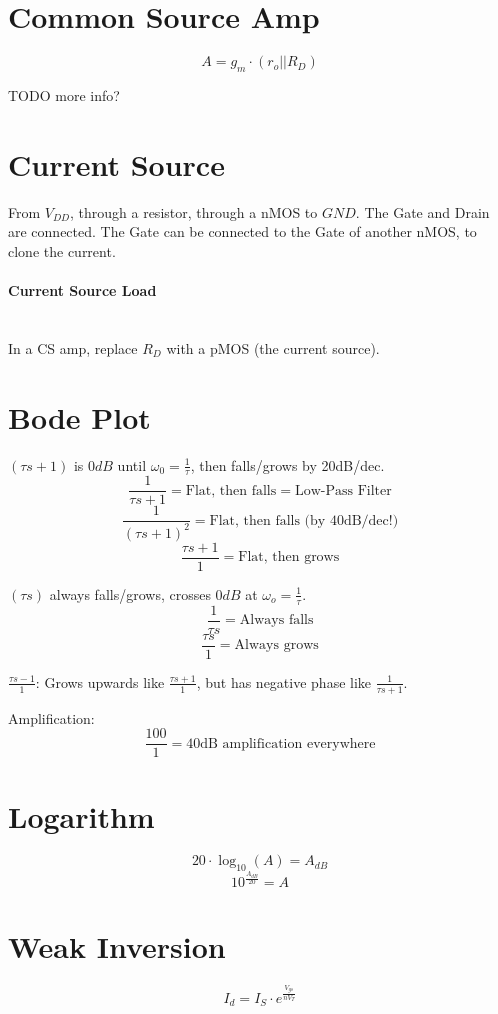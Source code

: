 \documentclass[twocolumn]{article}
\begin{document}
  \section{Common Source Amp}
    $$A = g_m \cdot (r_o || R_D)$$

    TODO more info?

  \section{Current Source}
    From $V_{DD}$, through a resistor, through a nMOS to $GND$.
    The Gate and Drain are connected.
    The Gate can be connected to the Gate of another nMOS, to clone the current.

    \paragraph{Current Source Load} \hfill \\
      In a CS amp, replace $R_D$ with a pMOS (the current source).

  \section{Bode Plot}
    $(\tau s + 1)$ is $0dB$ until $\omega_0 = \frac{1}{\tau}$, then falls/grows
    by 20dB/dec.
    $$\frac{1}{\tau s + 1} = \text{Flat, then falls} = \text{Low-Pass Filter}$$
    $$\frac{1}{(\tau s + 1)^2} = \text{Flat, then falls (by 40dB/dec!)}$$
    $$\frac{\tau s + 1}{1} = \text{Flat, then grows}$$

    $(\tau s)$ always falls/grows, crosses $0dB$ at $\omega_o = \frac{1}{\tau}$.
    $$\frac{1}{\tau s} = \text{Always falls}$$
    $$\frac{\tau s}{1} = \text{Always grows}$$

    $\frac{\tau s - 1}{1}$:
    Grows upwards like $\frac{\tau s + 1}{1}$, but has negative phase like
    $\frac{1}{\tau s + 1}$.

    Amplification:
    $$\frac{100}{1} = \text{40dB amplification everywhere}$$

  \section{Logarithm}
    $$20 \cdot \log_{10}(A) = A_{dB}$$
    $$10^{\frac{A_{dB}}{20}} = A$$

  \section{Weak Inversion}
    $$I_d = I_S \cdot e^{\frac{V_{gs}}{n V_T}}$$
\end{document}
